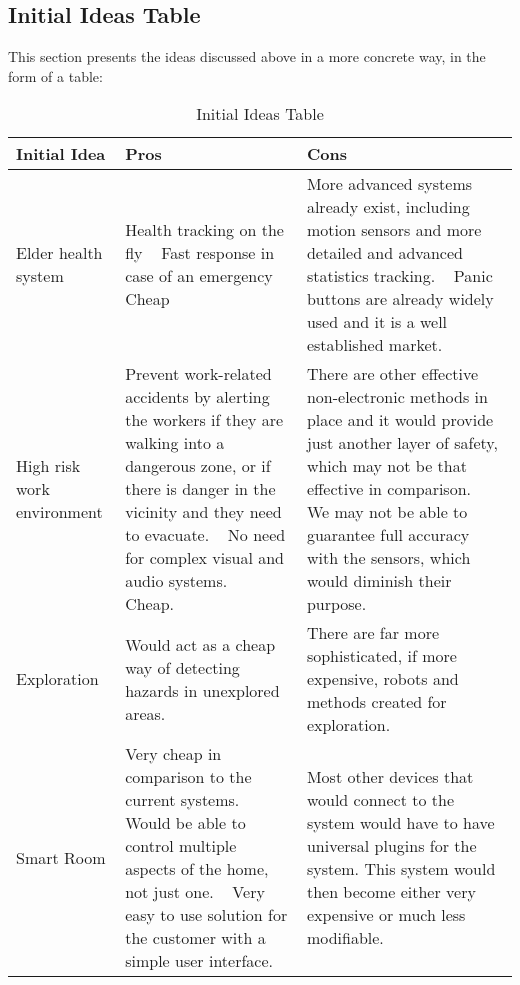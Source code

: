 \documentclass[../document.tex]{subfiles}
\begin{document}
\subsection{Initial Ideas Table}
This section presents the ideas discussed above in a more concrete way, in the form of a table:

\begin{table}[H]
\caption{Initial Ideas Table}
\centering
\begin{tabularx}{\textwidth}{ |X|X|X|}
\hline
\textbf{Initial Idea}
&
\textbf{Pros}
&
\textbf{Cons}
\\ \hline
Elder health system
&
Health tracking on the fly 
\newline \ \newline
Fast response in case of an emergency
\newline \ \newline
Cheap
&
More advanced systems already exist, including motion sensors and more detailed and advanced statistics tracking.
\newline \ \newline
Panic buttons are already widely used and it is a well established market.
\\ \hline
High risk work environment
&
Prevent work-related accidents by alerting the workers if they are walking into a dangerous zone, or if there is danger in the vicinity and they need to evacuate.  
\newline \ \newline
No need for complex visual and audio systems. 
\newline \ \newline
Cheap.
&
There are other effective non-electronic methods in place and it would provide just another layer of safety, which may not be that effective in comparison.
 \newline \ \newline
We may not be able to guarantee full accuracy with the sensors, which would diminish their purpose.
\\ \hline
Exploration
&
Would act as a cheap way of detecting hazards in unexplored areas.
&
There are far more sophisticated, if more expensive, robots and methods created for exploration.
\\ \hline
Smart Room
&
Very cheap in comparison to the current systems.
 \newline \ \newline
Would be able to control multiple aspects of the home, not just one.
 \newline \ \newline
Very easy to use solution for the customer with a simple user interface. 
&
Most other devices that would connect to the system would have to have universal plugins for the system. This system would then become either very expensive or much less modifiable.
\\ \hline
\end{tabularx}
\end{table}
\end{document}
